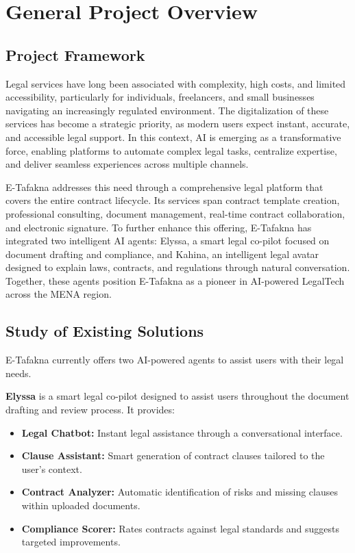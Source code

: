 \section{General Project Overview}
\label{sec:general-overview}

\subsection{Project Framework}

Legal services have long been associated with complexity, high costs, and limited accessibility, 
particularly for individuals, freelancers, and small businesses navigating an increasingly 
regulated environment. The digitalization of these services has become a strategic priority, 
as modern users expect instant, accurate, and accessible legal support. In this context, 
\ac{AI} is emerging as a transformative force, enabling platforms to automate complex legal 
tasks, centralize expertise, and deliver seamless experiences across multiple channels.

E-Tafakna addresses this need through a comprehensive legal platform that covers the entire 
contract lifecycle. Its services span contract template creation, professional consulting, 
document management, real-time contract collaboration, and electronic signature. To further 
enhance this offering, E-Tafakna has integrated two intelligent \ac{AI} agents: Elyssa, a 
smart legal co-pilot focused on document drafting and compliance, and Kahina, an intelligent 
legal avatar designed to explain laws, contracts, and regulations through natural conversation. 
Together, these agents position E-Tafakna as a pioneer in \ac{AI}-powered LegalTech across 
the \ac{MENA} region.

\subsection{Study of Existing Solutions}

E-Tafakna currently offers two \ac{AI}-powered agents to assist users with their legal needs.

\textbf{Elyssa} is a smart legal co-pilot designed to assist users throughout the document 
drafting and review process. It provides:

\begin{itemize}
    \item \textbf{Legal Chatbot:} Instant legal assistance through a conversational interface.
    \item \textbf{Clause Assistant:} Smart generation of contract clauses tailored to the 
    user's context.
    \item \textbf{Contract Analyzer:} Automatic identification of risks and missing clauses 
    within uploaded documents.
    \item \textbf{Compliance Scorer:} Rates contracts against legal standards and suggests 
    targeted improvements.
\end{itemize}


